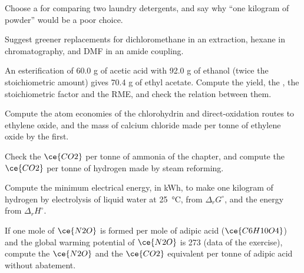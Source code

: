 \begin{exercise}[$\star$]\label{exo:b3:green-industrial:3}
Choose a  for comparing two laundry detergents, and say why
``one kilogram of powder'' would be a poor choice.
\end{exercise}

\begin{exercise}[$\star$]\label{exo:b3:green-industrial:4}
Suggest greener replacements for dichloromethane in an extraction, hexane in
chromatography, and DMF in an amide coupling.
\end{exercise}

\begin{exercise}[$\star\star$]\label{exo:b3:green-industrial:5}
An esterification of 60.0 g of acetic acid with 92.0 g of ethanol (twice the
stoichiometric amount) gives 70.4 g of ethyl acetate. Compute the yield, the , the stoichiometric factor and the RME, and check the relation between
them.
\end{exercise}

\begin{exercise}[$\star\star$]\label{exo:b3:green-industrial:6}
Compute the atom economies of the chlorohydrin and direct-oxidation routes to
ethylene oxide, and the mass of calcium chloride made per tonne of ethylene oxide
by the first.
\end{exercise}

\begin{exercise}[$\star\star$]\label{exo:b3:green-industrial:7}
Check the $\ce{CO2}$ per tonne of ammonia of the chapter, and compute the $\ce{CO2}$ per tonne of
hydrogen made by steam reforming.
\end{exercise}

\begin{exercise}[$\star\star$]\label{exo:b3:green-industrial:8}
Compute the minimum electrical energy, in kWh, to make one kilogram of hydrogen by
electrolysis of liquid water at \qty{25}{\celsius}, from $\Delta_rG^\circ$, and the energy from $\Delta_rH^\circ$.
\end{exercise}

\begin{exercise}[$\star\star$]\label{exo:b3:green-industrial:9}
If one mole of $\ce{N2O}$ is formed per mole of adipic acid ($\ce{C6H10O4}$) and the global warming
potential of $\ce{N2O}$ is 273 (data of the exercise), compute the $\ce{N2O}$ and the $\ce{CO2}$ equivalent
per tonne of adipic acid without abatement.
\end{exercise}

